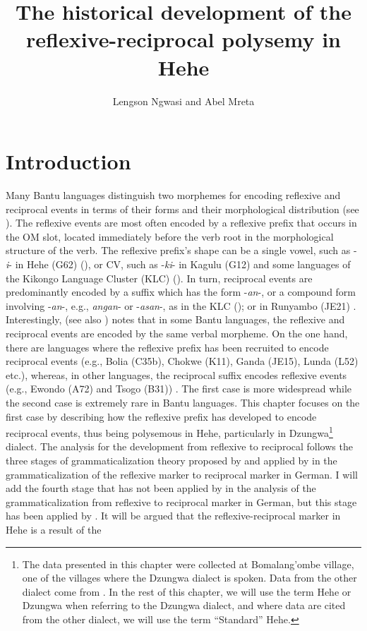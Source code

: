 \documentclass[output=paper,
            colorlinks, citecolor=brown
            ,draftmode
		  ]{langscibook}
\author{Lengson Ngwasi\orcid{}\affiliation{University of Dar es Salaam} and Abel Mreta\orcid{}\affiliation{University of Dar es Salaam}}
\title{The historical development of the reflexive-reciprocal polysemy in Hehe}
\begin{document}
\maketitle 


\section{Introduction}\label{sec:ngwasi:1}

Many Bantu languages distinguish two morphemes for encoding reflexive and reciprocal events in terms of their forms and their morphological distribution (see \citealt{Meeussen1967, Schadeberg2003, SchadebergBostoen2019}). The reflexive events are most often encoded by a reflexive prefix that occurs in the OM slot, located immediately before the verb root in the morphological structure of the verb. The reflexive prefix’s shape can be a single vowel, such as -\textit{i}{}- in Hehe (G62) (\citealt{Msamba2013, Ngwasi2016,Ngwasi2021}), or CV, such as -\textit{ki}{}- in Kagulu (G12) \citep{Petzell2008} and some languages of the Kikongo Language Cluster (KLC) (\citealt{DomKulikov2019}). In turn, reciprocal events are predominantly encoded by a suffix which has the form -\textit{an}{}-, or a compound form involving -\textit{an}{}-, e.g., \textit{angan}{}- or -\textit{asan}{}-, as in the KLC (\citealt{BostoenEtAl2015}); or in Runyambo (JE21) \citep{Rugemalira1993runyambo}. Interestingly, \citet{Polak1983} (see also \citealt{Marlo2015exceptional}) notes that in some Bantu languages, the reflexive and reciprocal events are encoded by the same verbal morpheme. On the one hand, there are languages where the reflexive prefix has been recruited to encode reciprocal events (e.g., Bolia (C35b), Chokwe (K11), Ganda (JE15), Lunda (L52) etc.), whereas, in other languages, the reciprocal suffix encodes reflexive events (e.g., Ewondo (A72) and Tsogo (B31)) \citep{Marlo2015exceptional}. The first case is more widespread while the second case is extremely rare in Bantu languages. This chapter focuses on the first case by describing how the reflexive prefix has developed to encode reciprocal events, thus being polysemous in Hehe, particularly in Dzungwa\footnote{The data presented in this chapter were collected at Bomalang’ombe village, one of the villages where the Dzungwa dialect is spoken. Data from the other dialect come from \citet{Msamba2013}. In the rest of this chapter, we will use the term Hehe or Dzungwa when referring to the Dzungwa dialect, and where data are cited from the other dialect, we will use the term ``Standard'' Hehe.} dialect. The analysis for the development from reflexive to reciprocal follows the three stages of grammaticalization theory proposed by \citet{Heine1993} and applied by \citet{HeineNarrog2009} in the grammaticalization of the reflexive marker to reciprocal marker in German. I will add the fourth stage that has not been applied by \citet{HeineNarrog2009} in the analysis of the grammaticalization from reflexive to reciprocal marker in German, but this stage has been applied by \citet{Ngwasi2021}. It will be argued that the reflexive\nobreakdash-reciprocal marker in Hehe is a result of the 
\end{document}
